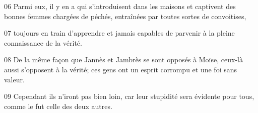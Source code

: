 
06 Parmi eux, il y en a qui s’introduisent dans les maisons et captivent des bonnes femmes chargées de péchés, entraînées par toutes sortes de convoitises,

07 toujours en train d’apprendre et jamais capables de parvenir à la pleine connaissance de la vérité.

08 De la même façon que Jannès et Jambrès se sont opposés à Moïse, ceux-là aussi s’opposent à la vérité; ces gens ont un esprit corrompu et une foi sans valeur.

09 Cependant ils n’iront pas bien loin, car leur stupidité sera évidente pour tous, comme le fut celle des deux autres.
